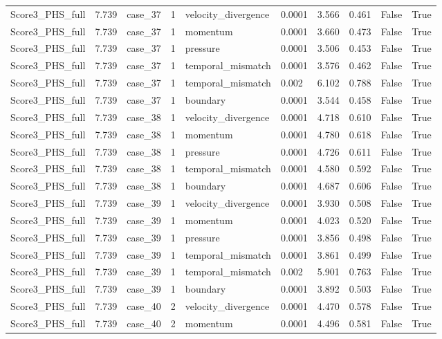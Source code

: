 \begin{longtable}{llllllllll}
Score3\_PHS\_full & 7.739 & case\_37 & 1 & velocity\_divergence & 0.0001 & 3.566 & 0.461 & False & True \\
Score3\_PHS\_full & 7.739 & case\_37 & 1 & momentum & 0.0001 & 3.660 & 0.473 & False & True \\
Score3\_PHS\_full & 7.739 & case\_37 & 1 & pressure & 0.0001 & 3.506 & 0.453 & False & True \\
Score3\_PHS\_full & 7.739 & case\_37 & 1 & temporal\_mismatch & 0.0001 & 3.576 & 0.462 & False & True \\
Score3\_PHS\_full & 7.739 & case\_37 & 1 & temporal\_mismatch & 0.002 & 6.102 & 0.788 & False & True \\
Score3\_PHS\_full & 7.739 & case\_37 & 1 & boundary & 0.0001 & 3.544 & 0.458 & False & True \\
Score3\_PHS\_full & 7.739 & case\_38 & 1 & velocity\_divergence & 0.0001 & 4.718 & 0.610 & False & True \\
Score3\_PHS\_full & 7.739 & case\_38 & 1 & momentum & 0.0001 & 4.780 & 0.618 & False & True \\
Score3\_PHS\_full & 7.739 & case\_38 & 1 & pressure & 0.0001 & 4.726 & 0.611 & False & True \\
Score3\_PHS\_full & 7.739 & case\_38 & 1 & temporal\_mismatch & 0.0001 & 4.580 & 0.592 & False & True \\
Score3\_PHS\_full & 7.739 & case\_38 & 1 & boundary & 0.0001 & 4.687 & 0.606 & False & True \\
Score3\_PHS\_full & 7.739 & case\_39 & 1 & velocity\_divergence & 0.0001 & 3.930 & 0.508 & False & True \\
Score3\_PHS\_full & 7.739 & case\_39 & 1 & momentum & 0.0001 & 4.023 & 0.520 & False & True \\
Score3\_PHS\_full & 7.739 & case\_39 & 1 & pressure & 0.0001 & 3.856 & 0.498 & False & True \\
Score3\_PHS\_full & 7.739 & case\_39 & 1 & temporal\_mismatch & 0.0001 & 3.861 & 0.499 & False & True \\
Score3\_PHS\_full & 7.739 & case\_39 & 1 & temporal\_mismatch & 0.002 & 5.901 & 0.763 & False & True \\
Score3\_PHS\_full & 7.739 & case\_39 & 1 & boundary & 0.0001 & 3.892 & 0.503 & False & True \\
Score3\_PHS\_full & 7.739 & case\_40 & 2 & velocity\_divergence & 0.0001 & 4.470 & 0.578 & False & True \\
Score3\_PHS\_full & 7.739 & case\_40 & 2 & momentum & 0.0001 & 4.496 & 0.581 & False & True \\

\end{longtable}
